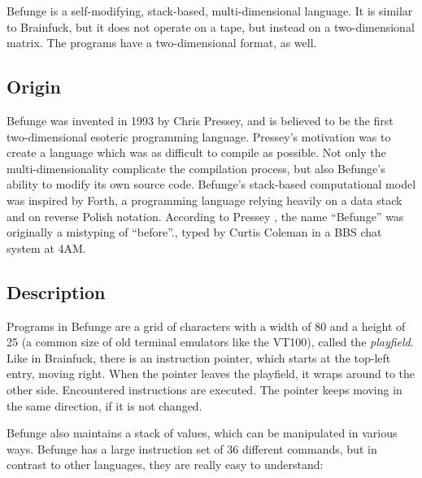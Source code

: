 Befunge is a self-modifying, stack-based, multi-dimensional language. It is similar to Brainfuck, but it does not operate on a tape, but instead on a two-dimensional matrix. The programs have a two-dimensional format, as well.

\subsection{Origin}

Befunge was invented in 1993 by Chris Pressey, and is believed to be the first two-dimensional esoteric programming language. Pressey's motivation was to create a language which was as difficult to compile as possible. Not only the multi-dimensionality complicate the compilation process, but also Befunge's ability to modify its own source code. Befunge's stack-based computational model was inspired by Forth, a programming language relying heavily on a data stack and on reverse Polish notation. According to Pressey \cite{pressey_coleman}, the name “Befunge” was originally a mistyping of “before”., typed by Curtis Coleman in a BBS chat system at 4AM.

\subsection{Description}

Programs in Befunge are a grid of \ascii{} characters with a width of 80 and a height of 25 (a common size of old terminal emulators like the VT100), called the \emph{playfield}. Like in Brainfuck, there is an instruction pointer, which starts at the top-left entry, moving right. When the pointer leaves the playfield, it wraps around to the other side. Encountered instructions are executed. The pointer keeps moving in the same direction, if it is not changed.

Befunge also maintains a stack of values, which can be manipulated in various ways. Befunge has a large instruction set of 36 different commands, but in contrast to other languages, they are really easy to understand:


